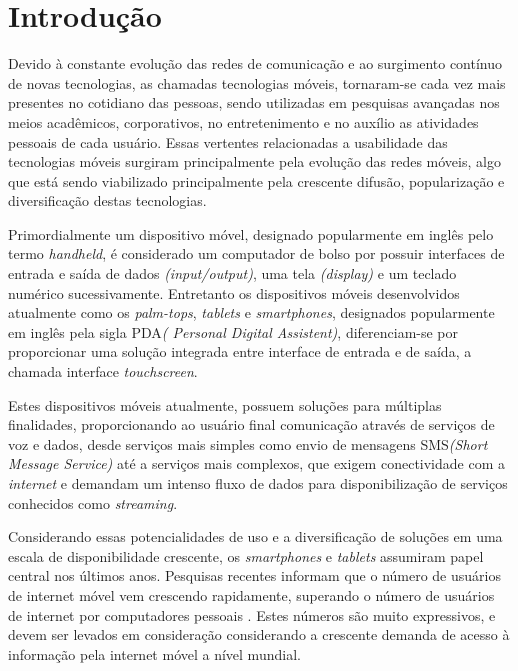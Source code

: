\chapter{Introdução}
\label{cap:introducao}

Devido à constante evolução das redes de comunicação e ao surgimento contínuo de
novas tecnologias, as chamadas tecnologias móveis, tornaram-se cada vez mais
presentes no cotidiano das pessoas, sendo utilizadas em pesquisas avançadas nos
meios acadêmicos, corporativos, no entretenimento e no auxílio as atividades
pessoais de cada usuário. Essas vertentes relacionadas a usabilidade
das tecnologias móveis surgiram principalmente pela evolução das redes
móveis, algo que está sendo viabilizado principalmente pela crescente difusão,
popularização e diversificação destas tecnologias.

Primordialmente um dispositivo móvel, designado popularmente em inglês pelo termo
\textit{handheld}, é considerado um computador de bolso por possuir interfaces
de entrada e saída de dados \textit{(input/output)}, uma tela \textit{(display)}
e um teclado numérico sucessivamente. Entretanto os dispositivos móveis
desenvolvidos atualmente como os \textit{palm-tops}, \textit{tablets} e
\textit{smartphones}, designados popularmente em inglês pela sigla PDA\textit{(
Personal Digital Assistent)}, diferenciam-se por proporcionar uma solução
integrada entre interface de entrada e de saída, a chamada interface
\textit{touchscreen}.

Estes dispositivos móveis atualmente, possuem soluções para múltiplas finalidades,
proporcionando ao usuário final comunicação através de serviços de voz e dados,
desde serviços mais simples como envio de mensagens SMS\textit{(Short Message
Service)} até a serviços mais complexos, que exigem
conectividade com a \textit{internet} e demandam um intenso fluxo de dados para
disponibilização de serviços conhecidos como \textit{streaming}.

Considerando essas potencialidades de uso e a diversificação de soluções em uma
escala de disponibilidade crescente, os \textit{smartphones} e \textit{tablets}
assumiram papel central nos últimos anos. Pesquisas recentes informam que o
número de usuários de internet móvel vem crescendo rapidamente, superando
o número de usuários de internet por computadores pessoais 
\cite{devitt2010meeker}. Estes números são muito expressivos, e devem ser levados 
em consideração considerando a crescente demanda de acesso à informação pela internet 
móvel a nível mundial. \cite{mobile2016}

